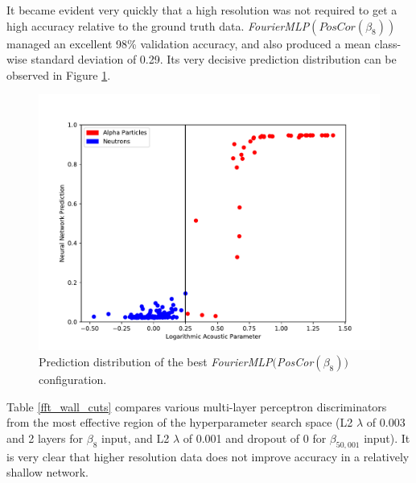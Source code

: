\documentclass[10pt]{article}
\begin{document}
It became evident very quickly that a high resolution was not required to get a high accuracy relative to the ground truth data. {\it FourierMLP}$(PosCor(\beta_{8}))$ managed an excellent 98\% validation accuracy, and also produced a mean class-wise standard deviation of 0.29. Its very decisive prediction distribution can be observed in Figure \ref{banded_no_pos_input_hist}.

\begin{figure}[h]
    \centering
    \includegraphics[width=\textwidth]{banded_no_pos_input_hist}
    \caption{\label{banded_no_pos_input_hist} Prediction distribution of the best {\it FourierMLP}$(${\it PosCor}$(\beta_{8}))$ configuration.}
\end{figure}

Table \ref{fft_wall_cuts} compares various multi-layer perceptron discriminators from the most effective region of the hyperparameter search space (L2 $\lambda$ of 0.003 and 2 layers for $\beta_8$ input, and L2 $\lambda$ of 0.001 and dropout of 0 for $\beta_{50,001}$ input). It is very clear that higher resolution data does not improve accuracy in a relatively shallow network.
\end{document}
